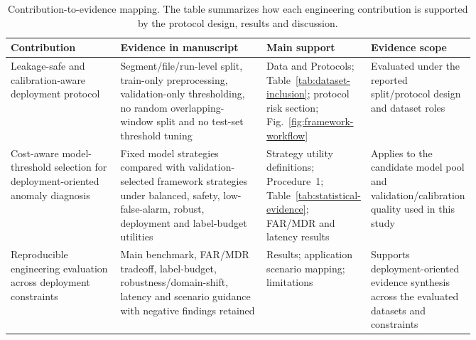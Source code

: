 \begin{table}[!htbp]
\centering
\footnotesize
\setlength{\tabcolsep}{4pt}
\renewcommand{\arraystretch}{1.12}
\caption{Contribution-to-evidence mapping. The table summarizes how each engineering contribution is supported by the protocol design, results and discussion.}
\label{tab:contribution-evidence}
\begin{tabularx}{\linewidth}{@{}>{\RaggedRight\arraybackslash}p{0.24\linewidth}>{\RaggedRight\arraybackslash}p{0.32\linewidth}>{\RaggedRight\arraybackslash}p{0.20\linewidth}>{\RaggedRight\arraybackslash}X@{}}
\toprule
Contribution & Evidence in manuscript & Main support & Evidence scope \\
\midrule
Leakage-safe and calibration-aware deployment protocol & Segment/file/run-level split, train-only preprocessing, validation-only thresholding, no random overlapping-window split and no test-set threshold tuning & Data and Protocols; Table~\ref{tab:dataset-inclusion}; protocol risk section; Fig.~\ref{fig:framework-workflow} & Evaluated under the reported split/protocol design and dataset roles \\
Cost-aware model-threshold selection for deployment-oriented anomaly diagnosis & Fixed model strategies compared with validation-selected framework strategies under balanced, safety, low-false-alarm, robust, deployment and label-budget utilities & Strategy utility definitions; Procedure~1; Table~\ref{tab:statistical-evidence}; FAR/MDR and latency results & Applies to the candidate model pool and validation/calibration quality used in this study \\
Reproducible engineering evaluation across deployment constraints & Main benchmark, FAR/MDR tradeoff, label-budget, robustness/domain-shift, latency and scenario guidance with negative findings retained & Results; application scenario mapping; limitations & Supports deployment-oriented evidence synthesis across the evaluated datasets and constraints \\
\bottomrule
\end{tabularx}
\end{table}
